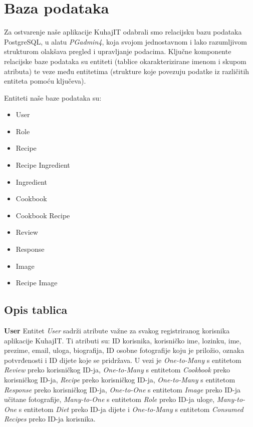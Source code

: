		\section{Baza podataka}

		Za ostvarenje naše aplikacije KuhajIT odabrali smo relacijsku bazu podataka PostgreSQL, u alatu \textit{PGadmin4}, koja svojom jednostavnom i lako razumljivom strukturom olakšava pregled i upravljanje podacima. Ključne komponente relacijske baze podataka su entiteti (tablice okarakterizirane imenom i skupom atributa) te veze među entitetima (strukture koje povezuju podatke iz različitih entiteta pomoću ključeva).
		
		Entiteti naše baze podataka su:
		\begin{itemize}
			\item User
			\item Role
			\item Recipe
			\item Recipe Ingredient
			\item Ingredient
			\item Cookbook
			\item Cookbook Recipe
			\item Review
			\item Response
			\item Image
			\item Recipe Image
		\end{itemize}
		
		
			\subsection{Opis tablica}
				
				\textbf{User} Entitet \textit{User} sadrži atribute važne za svakog registriranog korisnika aplikacije KuhajIT. Ti atributi su: ID korisnika, korisničko ime, lozinku, ime, prezime, email, uloga, biografija, ID osobne fotografije koju je priložio, oznaka potvrđenosti i ID dijete koje se pridržava. U vezi je \textit{One-to-Many} s entitetom \textit{Review} preko korisničkog ID-ja, \textit{One-to-Many} s entitetom \textit{Cookbook} preko korisničkog ID-ja, \textit{Recipe} preko korisničkog ID-ja, \textit{One-to-Many} s entitetom \textit{Response} preko korisničkog ID-ja, \textit{One-to-One} s entitetom \textit{Image} preko ID-ja učitane fotografije, \textit{Many-to-One} s entitetom \textit{Role} preko ID-ja uloge, \textit{Many-to-One} s entitetom \textit{Diet} preko ID-ja dijete i \textit{One-to-Many} s entitetom \textit{Consumed Recipes} preko ID-ja korisnika.
				
